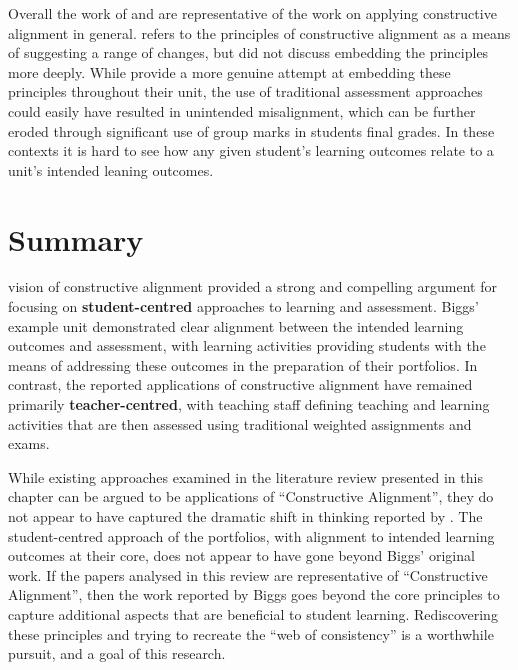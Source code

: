 Overall the work of \citet{Gaspar:2012} and \citet{Thota:2010} are representative of the work on applying constructive alignment in general. \citet{Gaspar:2012} refers to the principles of constructive alignment \cite{Biggs:1996c} as a means of suggesting a range of changes, but did not discuss embedding the principles more deeply. While \citet{Thota:2010} provide a more genuine attempt at embedding these principles throughout their unit, the use of traditional assessment approaches could easily have resulted in unintended misalignment, which can be further eroded through significant use of group marks in students final grades. In these contexts it is hard to see how any given student's learning outcomes relate to a unit's intended leaning outcomes.


\clearpage
\section{Summary} %
\label{sec:closing_comments}

\citet{Biggs:1996c} vision of constructive alignment provided a strong and compelling argument for focusing on \textbf{student-centred} approaches to learning and assessment. Biggs' example unit demonstrated clear alignment between the intended learning outcomes and assessment, with learning activities providing students with the means of addressing these outcomes in the preparation of their portfolios. In contrast, the reported applications of constructive alignment have remained primarily \textbf{teacher-centred}, with teaching staff defining teaching and learning activities that are then assessed using traditional weighted assignments and exams.

While existing approaches examined in the literature review presented in this chapter can be argued to be applications of ``Constructive Alignment'', they do not appear to have captured the dramatic shift in thinking reported by \citet{Biggs:1996c}. The student-centred approach of the portfolios, with alignment to intended learning outcomes at their core, does not appear to have gone beyond Biggs' original work. If the papers analysed in this review are representative of ``Constructive Alignment'', then the work reported by Biggs goes beyond the core principles to capture additional aspects that are beneficial to student learning. Rediscovering these principles and trying to recreate the ``web of consistency'' is a worthwhile pursuit, and a goal of this research.


